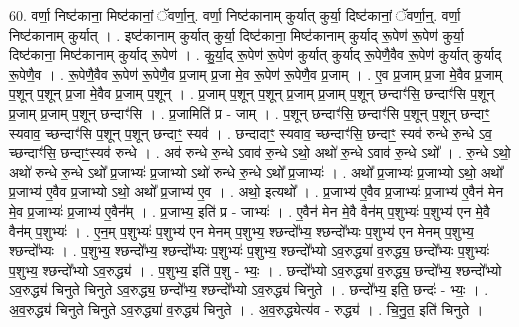 \documentclass[17pt]{extarticle}
\begin{document}
60. वर्णा॒ निष्ट॑काना॒ मिष्ट॑कानां॒ ॅवर्णा॒न्॒. वर्णा॒ निष्ट॑कानाम् कुर्यात् कुर्या॒ दिष्ट॑कानां॒ ॅवर्णा॒न्॒. वर्णा॒ निष्ट॑कानाम् कुर्यात् । . इष्ट॑कानाम् कुर्यात् कुर्या॒ दिष्ट॑काना॒ मिष्ट॑कानाम् कुर्याद् रू॒पेण॑ रू॒पेण॑ कुर्या॒ दिष्ट॑काना॒ मिष्ट॑कानाम् कुर्याद् रू॒पेण॑ । . कु॒र्या॒द् रू॒पेण॑ रू॒पेण॑ कुर्यात् कुर्याद् रू॒पेणै॒वैव रू॒पेण॑ कुर्यात् कुर्याद् रू॒पेणै॒व । . रू॒पेणै॒वैव रू॒पेण॑ रू॒पेणै॒व प्र॒जाम् प्र॒जा मे॒व रू॒पेण॑ रू॒पेणै॒व प्र॒जाम् । . ए॒व प्र॒जाम् प्र॒जा मे॒वैव प्र॒जाम् प॒शून् प॒शून् प्र॒जा मे॒वैव प्र॒जाम् प॒शून् । . प्र॒जाम् प॒शून् प॒शून् प्र॒जाम् प्र॒जाम् प॒शून् छन्दाꣳ॑सि॒ छन्दाꣳ॑सि प॒शून् प्र॒जाम् प्र॒जाम् प॒शून् छन्दाꣳ॑सि । . प्र॒जामिति॑ प्र - जाम् । . प॒शून् छन्दाꣳ॑सि॒ छन्दाꣳ॑सि प॒शून् प॒शून् छन्दाꣳ॒॒ स्यवाव॒ च्छन्दाꣳ॑सि प॒शून् प॒शून् 
छन्दाꣳ॒॒ स्यव॑ । . छन्दादाꣳ॒॒ स्यवाव॒ च्छन्दाꣳ॑सि॒ छन्दाꣳ॒॒ स्यव॑ रुन्धे रु॒न्धे ऽव॒ च्छन्दाꣳ॑सि॒ छन्दाꣳ॒॒स्यव॑ रुन्धे । . अव॑ रुन्धे रु॒न्धे ऽवाव॑ रु॒न्धे ऽथो॒ अथो॑ रु॒न्धे ऽवाव॑ रु॒न्धे ऽथो᳚ । . रु॒न्धे ऽथो॒ अथो॑ रुन्धे रु॒न्धे ऽथो᳚ प्र॒जाभ्यः॑ प्र॒जाभ्यो ऽथो॑ रुन्धे रु॒न्धे ऽथो᳚ प्र॒जाभ्यः॑ । . अथो᳚ प्र॒जाभ्यः॑ प्र॒जाभ्यो ऽथो॒ अथो᳚ प्र॒जाभ्य॑ ए॒वैव प्र॒जाभ्यो ऽथो॒ अथो᳚ प्र॒जाभ्य॑ ए॒व । . अथो॒ इत्यथो᳚ । . प्र॒जाभ्य॑ ए॒वैव प्र॒जाभ्यः॑ प्र॒जाभ्य॑ ए॒वैन॑ मेन मे॒व प्र॒जाभ्यः॑ प्र॒जाभ्य॑ ए॒वैन᳚म् । . प्र॒जाभ्य॒ इति॑ प्र - जाभ्यः॑ । . ए॒वैन॑ मेन मे॒वै वैन॑म् प॒शुभ्यः॑ प॒शुभ्य॑ एन मे॒वै वैन॑म् प॒शुभ्यः॑ । . ए॒न॒म् प॒शुभ्यः॑ प॒शुभ्य॑ एन मेनम् प॒शुभ्य॒ श्छन्दो᳚भ्य॒ श्छन्दो᳚भ्यः प॒शुभ्य॑ एन मेनम् प॒शुभ्य॒ श्छन्दो᳚भ्यः । . प॒शुभ्य॒ श्छन्दो᳚भ्य॒ श्छन्दो᳚भ्यः प॒शुभ्यः॑ प॒शुभ्य॒ श्छन्दो᳚भ्यो ऽव॒रुद्ध्या॑ व॒रुद्ध्य॒ छन्दो᳚भ्यः प॒शुभ्यः॑ प॒शुभ्य॒ श्छन्दो᳚भ्यो ऽव॒रुद्ध्य॑ । . प॒शुभ्य॒ इति॑ प॒शु - भ्यः॒ । . छन्दो᳚भ्यो ऽव॒रुद्ध्या॑ व॒रुद्ध्य॒ छन्दो᳚भ्य॒ श्छन्दो᳚भ्यो ऽव॒रुद्ध्य॑ चिनुते चिनुते ऽव॒रुद्ध्य॒ छन्दो᳚भ्य॒ श्छन्दो᳚भ्यो ऽव॒रुद्ध्य॑ चिनुते । . छन्दो᳚भ्य॒ इति॒ छन्दः॑ - भ्यः॒ । . अ॒व॒रुद्ध्य॑ चिनुते चिनुते ऽव॒रुद्ध्या॑ व॒रुद्ध्य॑ चिनुते । . अ॒व॒रुद्ध्येत्य॑व - रुद्ध्य॑ । . चि॒नु॒त॒ इति॑ चिनुते । \newline
\pagebreak
{}
\end{document}

